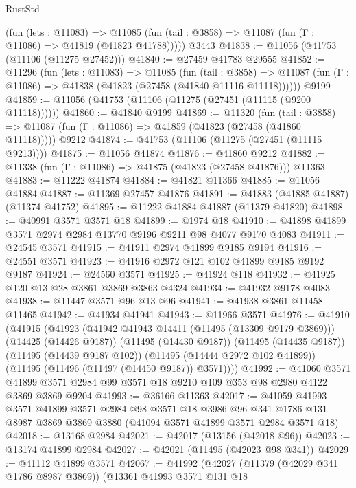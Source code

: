 \begin{lexlean}{RustStd}
\begin{coremodule}
      (fun (lets : @11083) =>
      @11085 (fun (tail : @3858) => @11087 (fun (Γ : @11086) => @41819 (@41823 @41788)))))
    @3443
@41838 := @11056 (@41753 (@11106 (@11275 @27452)))
@41840 := @27459 @41783 @29555
@41852 := @11296
    (fun (lets : @11083) =>
    @11085
      (fun (tail : @3858) =>
      @11087 (fun (Γ : @11086) => @41838 (@41823 (@27458 (@41840 @11116 @11118))))))
    @9199
@41859 := @11056 (@41753 (@11106 (@11275 (@27451 (@11115 (@9200 @11118))))))
@41860 := @41840 @9199
@41869 := @11320
    (fun (tail : @3858) => @11087 (fun (Γ : @11086) => @41859 (@41823 (@27458 (@41860 @11118)))))
    @9212
@41874 := @41753 (@11106 (@11275 (@27451 (@11115 @9213))))
@41875 := @11056 @41874
@41876 := @41860 @9212
@41882 := @11338 (fun (Γ : @11086) => @41875 (@41823 (@27458 @41876))) @11363
@41883 := @11222 @41874
@41884 := @41821 @11366
@41885 := @11056 @41884
@41887 := @11369 @27457 @41876
@41891 := @41883 (@41885 @41887) (@11374 @41752)
@41895 := @11222 @41884 @41887 (@11379 @41820)
@41898 := @40991 @3571 @3571 @18
@41899 := @1974 @18
@41910 := @41898 @41899 @3571 @2974 @2984 @13770 @9196 @9211 @98 @4077 @9170 @4083
@41911 := @24545 @3571
@41915 := @41911 @2974 @41899 @9185 @9194
@41916 := @24551 @3571
@41923 := @41916 @2972 @121 @102 @41899 @9185 @9192 @9187
@41924 := @24560 @3571
@41925 := @41924 @118
@41932 := @41925 @120 @13 @28 @3861 @3869 @3863 @4324
@41934 := @41932 @9178 @4083
@41938 := @11447 @3571 @96 @13 @96
@41941 := @41938 @3861 @11458 @11465
@41942 := @41934 @41941
@41943 := @11966 @3571
@41976 := @41910
    (@41915
      (@41923
        (@41942 @41943 @14411 (@11495 (@13309 @9179 @3869)))
        (@14425 (@14426 @9187))
        (@11495 (@14430 @9187))
        (@11495 (@14435 @9187))
        (@11495 (@14439 @9187 @102))
        (@11495 (@14444 @2972 @102 @41899))
        (@11495 (@11496 (@11497 (@14450 @9187)) @3571))))
@41992 := @41060
    @3571
    @41899
    @3571
    @2984
    @99
    @3571
    @18
    @9210
    @109
    @353
    @98
    @2980
    @4122
    @3869
    @3869
    @9204
@41993 := @36166 @11363
@42017 := @41059
    @41993
    @3571
    @41899
    @3571
    @2984
    @98
    @3571
    @18
    @3986
    @96
    @341
    @1786
    @131
    @8987
    @3869
    @3869
    @3880
    (@41094 @3571 @41899 @3571 @2984 @3571 @18)
@42018 := @13168 @2984
@42021 := @42017 (@13156 (@42018 @96))
@42023 := @13174 @41899 @2984
@42027 := @42021 (@11495 (@42023 @98 @341))
@42029 := @41112 @41899 @3571
@42067 := @41992
    (@42027
      (@11379 (@42029 @341 @1786 @8987 @3869))
      (@13361
        @41993
        @3571
        @131
        @18

\end{coremodule}
\end{lexlean}
